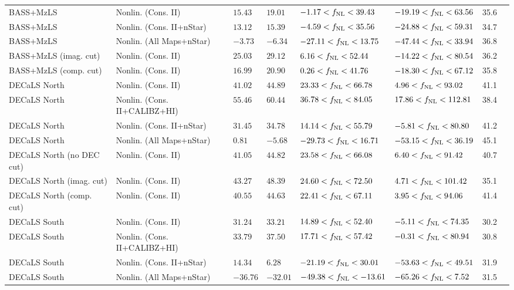\begin{table}
{\begin{tabular}{llllllll}
\hline
BASS+MzLS                        & Nonlin. (Cons. II)& $ 15.43$& $ 19.01$& $ -1.17<f_{\rm NL}< 39.43$& $-19.19<f_{\rm NL}< 63.56$ &   35.6\\
BASS+MzLS                        & Nonlin. (Cons. II+nStar)& $ 13.12$& $ 15.39$& $ -4.59<f_{\rm NL}< 35.56$& $-24.88<f_{\rm NL}< 59.31$ &   34.7\\
BASS+MzLS                        & Nonlin. (All Maps+nStar)& $ -3.73$& $ -6.34$& $-27.11<f_{\rm NL}< 13.75$& $-47.44<f_{\rm NL}< 33.94$ &   36.8\\
BASS+MzLS (imag. cut)      & Nonlin. (Cons. II)& $ 25.03$& $ 29.12$& $  6.16<f_{\rm NL}< 52.44$& $-14.22<f_{\rm NL}< 80.54$ &   36.2\\
BASS+MzLS (comp. cut)     & Nonlin. (Cons. II)& $ 16.99$& $ 20.90$& $  0.26<f_{\rm NL}< 41.76$& $-18.30<f_{\rm NL}< 67.12$ &   35.8\\
DECaLS North                     & Nonlin. (Cons. II)& $ 41.02$& $ 44.89$& $ 23.33<f_{\rm NL}< 66.78$& $  4.96<f_{\rm NL}< 93.02$ &   41.1\\
DECaLS North                     & Nonlin. (Cons. II+CALIBZ+HI)& $ 55.46$& $ 60.44$& $ 36.78<f_{\rm NL}< 84.05$& $ 17.86<f_{\rm NL}<112.81$ &   38.4\\
DECaLS North                     & Nonlin. (Cons. II+nStar)& $ 31.45$& $ 34.78$& $ 14.14<f_{\rm NL}< 55.79$& $ -5.81<f_{\rm NL}< 80.80$ &   41.2\\
DECaLS North                     & Nonlin. (All Maps+nStar)& $  0.81$& $ -5.68$& $-29.73<f_{\rm NL}< 16.71$& $-53.15<f_{\rm NL}< 36.19$ &   45.1\\
DECaLS North (no DEC cut)      & Nonlin. (Cons. II)& $ 41.05$& $ 44.82$& $ 23.58<f_{\rm NL}< 66.08$& $  6.40<f_{\rm NL}< 91.42$ &   40.7\\
DECaLS North (imag. cut)   & Nonlin. (Cons. II)& $ 43.27$& $ 48.39$& $ 24.60<f_{\rm NL}< 72.50$& $  4.71<f_{\rm NL}<101.42$ &   35.1\\
DECaLS North (comp. cut)  & Nonlin. (Cons. II)& $ 40.55$& $ 44.63$& $ 22.41<f_{\rm NL}< 67.11$& $  3.95<f_{\rm NL}< 94.06$ &   41.4\\
DECaLS South                    & Nonlin. (Cons. II)& $ 31.24$& $ 33.21$& $ 14.89<f_{\rm NL}< 52.40$& $ -5.11<f_{\rm NL}< 74.35$ &   30.2\\
DECaLS South                    & Nonlin. (Cons. II+CALIBZ+HI)& $ 33.79$& $ 37.50$& $ 17.71<f_{\rm NL}< 57.42$& $ -0.31<f_{\rm NL}< 80.94$ &   30.8\\
DECaLS South                    & Nonlin. (Cons. II+nStar)& $ 14.34$& $  6.28$& $-21.19<f_{\rm NL}< 30.01$& $-53.63<f_{\rm NL}< 49.51$ &   31.9\\
DECaLS South                    & Nonlin. (All Maps+nStar)& $-36.76$& $-32.01$& $-49.38<f_{\rm NL}<-13.61$& $-65.26<f_{\rm NL}<  7.52$ &   31.5\\

\end{tabular}}
\end{table}
